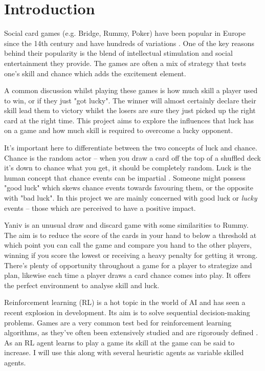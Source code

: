 \documentclass[../main.tex]{subfiles}
\begin{document}
\chapter{Introduction}
\label{cha:Introduction}

Social card games (e.g. Bridge, Rummy, Poker) have been popular in Europe since the 14th century and have hundreds of variations \cite{david_sidney_parlett_oxford_1990}. One of the key reasons behind their popularity is the blend of intellectual stimulation and social entertainment they provide. The games are often a mix of strategy that tests one's skill and chance which adds the excitement element.

A common discussion whilst playing these games is how much skill a player used to win, or if they just "got lucky". The winner will almost certainly declare their skill lead them to victory whilst the losers are sure they just picked up the right card at the right time. This project aims to explore the influences that luck has on a game and how much skill is required to overcome a lucky opponent. 

It's important here to differentiate between the two concepts of luck and chance. Chance is the random actor -- when you draw a card off the top of a shuffled deck it's down to chance what you get, it should be completely random. Luck is the human concept that chance events can be impartial \cite{levinson_chance_2001}. Someone might possess "good luck" which skews chance events towards favouring them, or the opposite with "bad luck". In this project we are mainly concerned with good luck or \textit{lucky} events -- those which are perceived to have a positive impact. 

Yaniv is an unusual draw and discard game with some similarities to Rummy. The aim is to reduce the score of the cards in your hand to below a threshold at which point you can call the game and compare you hand to the other players, winning if you score the lowest or receiving a heavy penalty for getting it wrong. There's plenty of opportunity throughout a game for a player to strategize and plan, likewise each time a player draws a card chance comes into play. It offers the perfect environment to analyse skill and luck. 

Reinforcement learning (RL) is a hot topic in the world of AI and has seen a recent explosion in development. Its aim is to solve sequential decision-making problems. Games are a very common test bed for reinforcement learning algorithms, as they've often been extensively studied and are rigorously defined \cite{ye_towards_2020}. As an RL agent learns to play a game its skill at the game can be said to increase. I will use this along with several heuristic agents as variable skilled agents. 
\end{document}
